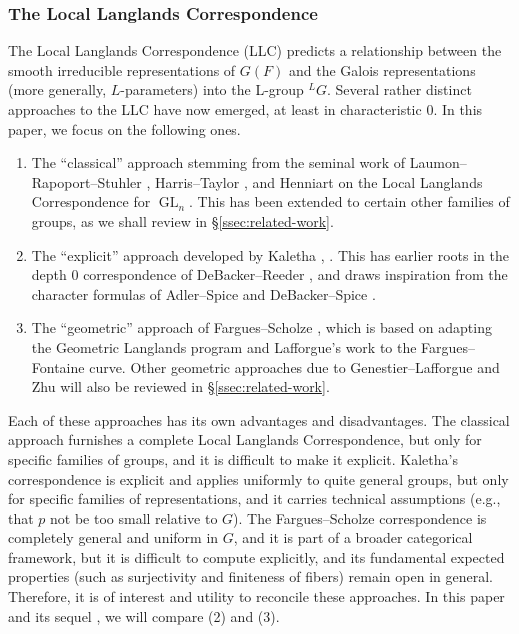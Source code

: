 \documentclass[reqno]{amsart}
\numberwithin{equation}{subsection}
\newcommand{\ld}{{}^L}
\DeclareMathOperator{\GL}{GL}
\theoremstyle{remark}
\numberwithin{equation}{subsection}
\numberwithin{figure}{subsection}
\begin{document}
\subsubsection{The Local Langlands Correspondence} The Local Langlands Correspondence (LLC) predicts a relationship between the smooth irreducible representations of $G(F)$ and the Galois representations (more generally, $L$-parameters) into the L-group $\ld G$. Several rather distinct approaches to the LLC have now emerged, at least in characteristic $0$. In this paper, we focus on the following ones. 
\begin{enumerate}
    \item The ``classical'' approach stemming from the seminal work of Laumon--Rapoport--Stuhler \cite{LRS93}, Harris--Taylor \cite{HT01}, and Henniart \cite{Hen00} on the Local Langlands Correspondence for $\GL_n$. This has been extended to certain other families of groups, as we shall review in \S \ref{ssec:related-work}. 
    \item The ``explicit'' approach developed by Kaletha \cite{Kal19}, \cite{Kal21b}. This has earlier roots in the depth 0 correspondence of DeBacker--Reeder \cite{DR09}, and draws inspiration from the character formulas of Adler--Spice and DeBacker--Spice \cite{AS09,DS18}. 
    \item The ``geometric'' approach of Fargues--Scholze \cite{FS}, which is based on adapting the Geometric Langlands program and Lafforgue's work \cite{Laff18} to the Fargues--Fontaine curve. Other geometric approaches due to Genestier--Lafforgue \cite{GL18} and Zhu \cite{Zhu25} will also be reviewed in \S \ref{ssec:related-work}.
\end{enumerate}

Each of these approaches has its own advantages and disadvantages. The classical approach furnishes a complete Local Langlands Correspondence, but only for specific families of groups, and it is difficult to make it explicit. Kaletha's correspondence is explicit and applies uniformly to quite general groups, but only for specific families of representations, and it carries technical assumptions (e.g., that $p$ not be too small relative to $G$). The Fargues--Scholze correspondence is completely general and uniform in $G$, and it is part of a broader categorical framework, but it is difficult to compute explicitly, and its fundamental expected properties (such as surjectivity and finiteness of fibers) remain open in general. Therefore, it is of interest and utility to reconcile these approaches. In this paper and its sequel \cite{CF26b}, we will compare (2) and 
(3). 
\end{document}
